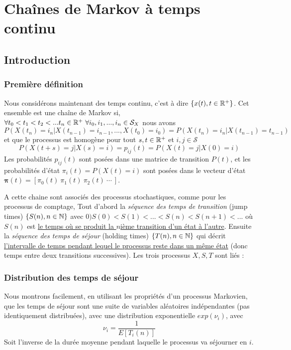 \documentclass[11pt,a4paper]{article}
\numberwithin{equation}{section}
\begin{document}
\section{Chaînes de Markov à temps continu}
\subsection{Introduction}
\subsubsection{Première définition}
Nous considérons maintenant des temps continu, c'est à dire $\{x(t), t \in \mathbb{R}^+\}$. Cet ensemble est une chaîne de Markov si, $\forall t_0 < t_1 < t_2 < ... t_n \in \mathbb{R}^+\ \forall i_0,i_1,...,i_n \in \mathcal{S}_X$ nous avons
\begin{equation}
    P(X(t_n) = i_n | X(t_{n-1}) = i_{n-1},...,X(t_0) = i_0) = P(X(t_n) = i_n | X(t_{n-1}) = t_{n-1})
\end{equation}
et que le processus est homogène pour tout $s,t \in \mathbb{R}^+$ et $i,j \in \mathcal{S}$
\[P(X(t+s) = j | X(s) = i) = p_{ij}(t) = P(X(t) = j | X(0) = i)\]
Les probabilités $p_{ij}(t)$ sont posées dans une matrice de transition $P(t)$, et les probabilités d'état $\pi_i(t) = P(X(t) = i)$ sont posées dans le vecteur d'état $\boldsymbol{\pi}(t) = [ \pi_0(t)\ \pi_1(t)\ \pi_2(t)\ \cdots\ ]$.

A cette chaine sont associés des processus stochastiques, comme pour les processus de comptage, Tout d'abord la \textit{séquence des temps de transition} (jump times) $\{S(n), n \in \mathbb{N}\}$ avec $0 ) S(0) < S(1) < ... < S(n) < S(n+1) < ...$ où $S(n)$ est \uline{le temps où se produit la $n$ième transition d'un état à l'autre}. Ensuite la \textit{séquence des temps de séjour} (holding times)  $\{T(n), n \in \mathbb{N}\}$ qui décrit \uline{l'intervalle de temps pendant lequel le processus reste dans un même état} (donc temps entre deux transitions successives). Les trois processus $X, S, T$ sont liés :

\subsubsection{Distribution des temps de séjour}
Nous montrons facilement, en utilisant les propriétés d'un processus Markovien, que les temps de séjour sont une suite de variables aléatoires indépendantes (pas identiquement distribuées), avec une distribution exponentielle $exp(\nu_i)$, avec
\[\nu_i = \frac{1}{E[T_i(n)]}\]
Soit l'inverse de la durée moyenne pendant laquelle le processus va séjourner en $i$.
\end{document}

